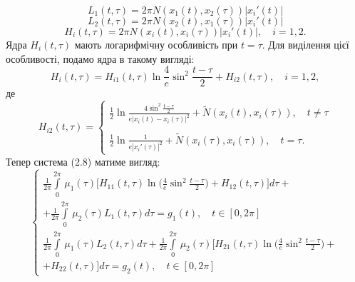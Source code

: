 \documentclass[a4 paper,12pt,ukrainian]{report}
\begin{document}
\begin{equation*}
L_{1}(t,\tau)=2\pi N(x_1(t),x_2(\tau))|x_{i}'(t)|
\end{equation*}
\begin{equation*}
L_{2}(t,\tau)=2\pi N(x_2(t),x_1(\tau))|x_{i}'(t)|
\end{equation*}
\begin{equation*}
H_{i}(t,\tau)=2\pi N(x_i(t),x_i(\tau))|x_{i}'(t)|, \quad i=1,2.
\end{equation*}
\hspace*{\parindent}Ядра $H_{i}(t,\tau)$ мають логарифмічну особливість при $t=\tau$. Для виділення цієї особливості, подамо ядра в такому вигляді:
\begin{equation*}
H_{i}(t,\tau)=H_{i1}(t,\tau)\ln{\frac{4}{e}\sin^2\frac{t-\tau}{2}}+H_{i2}(t,\tau), \quad i=1,2,
\end{equation*}
де
\begin{equation*}
H_{i2}(t,\tau)=\left\{
\begin{array}{l}
\displaystyle
\frac{1}{2}\ln{\frac{4\sin^2\frac{t-\tau}{2}}{e|x_{i}(t)-x_{i}(\tau)|^2}}+\tilde{N}(x_{i}(t),x_{i}(\tau)), \quad t\neq\tau\\ \\
\displaystyle
\frac{1}{2}\ln{\frac{1}{e|x_{i}'(\tau)|^2}}+\tilde{N}(x_{i}(\tau),x_{i}(\tau)), \quad t=\tau.
\end{array}
\right.
\end{equation*}
\hspace*{\parindent}Тепер система (2.8) матиме вигляд:
\begin{equation}
\left\{
\begin{array}{c}
\displaystyle
\frac{1}{2\pi}\int\limits_{0}^{2\pi} \,\mu_1(\tau)\Big[H_{11}(t,\tau)\ln{\Big(\frac{4}{e}\sin^2\frac{t-\tau}{2}\Big)}+H_{12}(t,\tau)\Big]d\tau+\\
\displaystyle
+\frac{1}{2\pi}\int\limits_{0}^{2\pi} \,\mu_2(\tau)L_{1}(t,\tau)d\tau=g_1(t),\quad  t \in [0, 2\pi]\\
\displaystyle
\frac{1}{2\pi}\int\limits_{0}^{2\pi} \,\mu_1(\tau)L_{2}(t,\tau)d\tau+\frac{1}{2\pi}\int\limits_{0}^{2\pi} \,\mu_2 (\tau)\Big[H_{21}(t,\tau)\ln{\Big(\frac{4}{e}\sin^2\frac{t-\tau}{2}\Big)}+\\
\displaystyle
+H_{22}(t,\tau)\Big]d\tau=g_2(t),\quad  t \in [0, 2\pi]
\end{array}
\right.
\end{equation}
\end{document}
